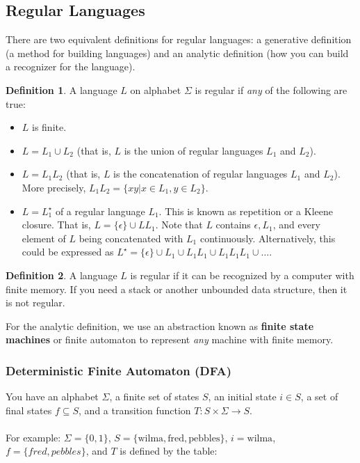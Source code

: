 \documentclass[]{article}
\theoremstyle{definition}
\newtheorem*{defn}{Definition}
\begin{document}
		\subsection{Regular Languages}
			There are two equivalent definitions for regular languages: a generative definition (a method for building languages) and an analytic definition (how you can build a recognizer for the language).
			\begin{defn}
				A language $L$ on alphabet $\Sigma$ is regular if \emph{any} of the following are true:
				\begin{itemize}
					\item $L$ is finite.
					\item $L = L_1 \cup L_2$ (that is, $L$ is the union of regular languages $L_1$ and $L_2$).
					\item $L = L_1 L_2$ (that is, $L$ is the concatenation of regular languages $L_1$ and $L_2$). More precisely, $L_1 L_2 = \{ xy | x \in L_1, y \in L_2 \}$.
					\item $L = L_1^\star$ of a regular language $L_1$. This is known as repetition or a Kleene closure. That is, $L = \{ \epsilon \} \cup L L_1$. Note that $L$ contains $\epsilon, L_1$, and every element of $L$ being concatenated with $L_1$ continuously. Alternatively, this could be expressed as $L^\star = \{ \epsilon \} \cup L_1 \cup L_1 L_1 \cup L_1 L_1 L_1 \cup \ldots$.
				\end{itemize}
			\end{defn}

			\begin{defn}
				A language $L$ is regular if it can be recognized by a computer with finite memory. If you need a stack or another unbounded data structure, then it is not regular.
			\end{defn}

			For the analytic definition, we use an abstraction known as \textbf{finite state machines} or {finite automaton} to represent \emph{any} machine with finite memory.
			\subsubsection{Deterministic Finite Automaton (DFA)}
				You have an alphabet $\Sigma$, a finite set of states $S$, an initial state $i \in S$, a set of final states $f \subseteq S$, and a transition function $T: S \times \Sigma \to S$.
				\\ \\
				For example: $\Sigma = \{ 0, 1 \}$, $S = \{ \text{wilma}, \text{fred}, \text{pebbles} \}$, $i = \text{wilma}$, $f = \{ fred, pebbles \}$, and $T$ is defined by the table:
\end{document}
